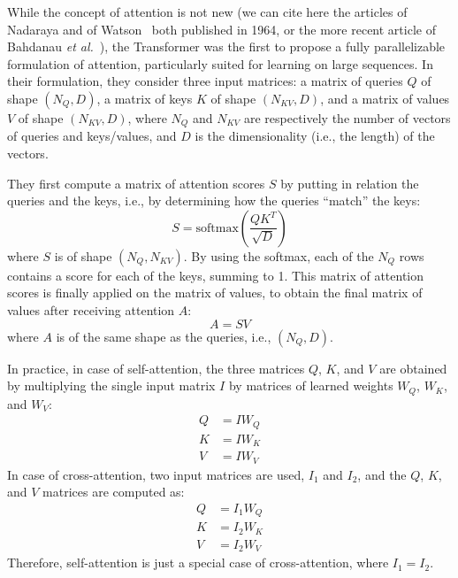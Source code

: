 While the concept of attention is not new (we can cite here the articles of Nadaraya and of Watson~\cite{Nadaraya1964OnER,Watson1964SmoothRA} both published in 1964, or the more recent article of Bahdanau \textit{et al.}~\cite{Bahdanau2014NeuralMT}), the Transformer was the first to propose a fully parallelizable formulation of attention, particularly suited for learning on large sequences. In their formulation, they consider three input matrices: a matrix of queries \(Q\) of shape \((N_Q, D)\), a matrix of keys \(K\) of shape \((N_{KV}, D)\), and a matrix of values \(V\) of shape \((N_{KV}, D)\), where \(N_Q\) and \(N_{KV}\) are respectively the number of vectors of queries and keys/values, and \(D\) is the dimensionality (i.e., the length) of the vectors.

They first compute a matrix of attention scores \(S\) by putting in relation the queries and the keys, i.e., by determining how the queries ``match'' the keys:
\begin{equation}
  S = \text{softmax}\left(\frac{QK^T}{\sqrt{D}}\right) \label{eq:delta:att_score}
\end{equation}
where \(S\) is of shape \((N_Q, N_{KV})\). By using the softmax, each of the \(N_Q\) rows contains a score for each of the keys, summing to 1. This matrix of attention scores is finally applied on the matrix of values, to obtain the final matrix of values after receiving attention \(A\):
\begin{equation}
  A = SV \label{eq:delta:att_values}
\end{equation}
where \(A\) is of the same shape as the queries, i.e., \((N_Q, D)\).

In practice, in case of self-attention, the three matrices \(Q\), \(K\), and \(V\) are obtained by multiplying the single input matrix \(I\) by matrices of learned weights \(W_Q\), \(W_K\), and \(W_V\):
\begin{align}
  Q &= I W_Q \nonumber\\
  K &= I W_K \\
  V &= I W_V \nonumber
\end{align}
In case of cross-attention, two input matrices are used, \(I_1\) and \(I_2\), and the \(Q\), \(K\), and \(V\) matrices are computed as:
\begin{align}
  Q &= I_1 W_Q \nonumber\\
  K &= I_2 W_K \\
  V &= I_2 W_V \nonumber
\end{align}
Therefore, self-attention is just a special case of cross-attention, where \(I_1 = I_2\).

